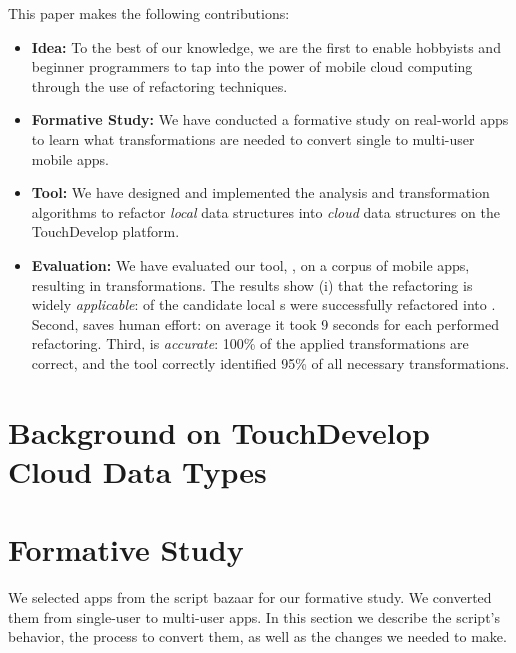 \documentclass{sigplanconf}
\begin{document}
This paper makes the following contributions:
\begin{itemize}
\item{\textbf{Idea:}} To the best of our knowledge, we are the first to enable hobbyists and beginner programmers to tap into the power of mobile cloud
computing through the use of refactoring techniques.

\item{\textbf{Formative Study:}} We have conducted a formative study on \numFormative real-world apps to learn what transformations are needed to convert single to multi-user mobile apps. 

\item{\textbf{Tool:}} We have designed and implemented the analysis and transformation algorithms to refactor \emph{local} data structures into \emph{cloud} data structures on the TouchDevelop platform. 

\item{\textbf{Evaluation:}} We have evaluated our tool, \tool, on a corpus of \numScripts mobile apps, resulting in \numTransformations transformations. The results show (i) that the refactoring is widely \emph{applicable}: \percentRefactored of the candidate local s were successfully refactored into . Second, \tool saves human effort: on average it took 9 seconds for each performed refactoring. Third, \tool is  
\emph{accurate}: 100\% of the applied transformations are correct, and the tool correctly identified 95\% of all necessary transformations.  
\end{itemize}


\section{Background on TouchDevelop Cloud Data Types}

\section{Formative Study}
\label{sec:Formative}

We selected \numFormative apps from the \TD script bazaar for our formative study. We converted them from single-user to multi-user apps. In this section we describe the script's behavior, the process to convert them, as well as the changes we needed to make.
\end{document}
